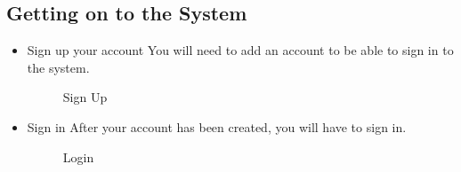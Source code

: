 \subsection{Getting on to the System}
\begin{itemize}
	\item{Sign up your account}
	\newline
	You will need to add an account to be able to sign in to the system.
	\begin{figure}[H]
	    	\centering
	    	\caption{Sign Up}
	    	\label{fig:Learning rate 0.1}
   	\end{figure}
	\item{Sign in}
	\newline
	After your account has been created, you will have to sign in.
	\begin{figure}[H]
	    	\centering
	    	\caption{Login}
	    	\label{fig:Learning rate 0.1}
   	\end{figure}
\end{itemize}
